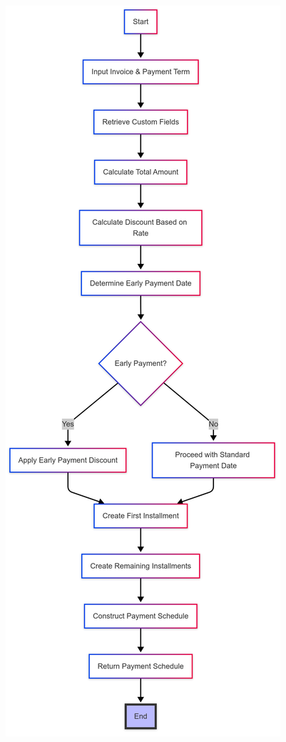 \documentclass[11pt,a4paper]{article}
\begin{document}
\begin{minipage}{0.45\textwidth}
    \centering
    \includegraphics[width=\linewidth]{diagram/paymenttermcustomization.png} 
\end{minipage}
\end{document}
